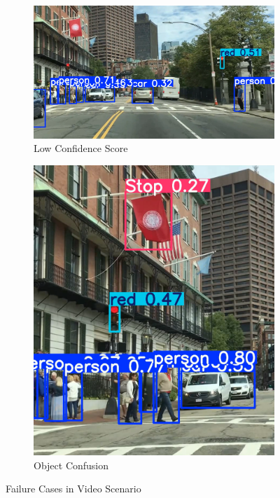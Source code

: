 \documentclass[journal,transmag]{IEEEtran}
\begin{document}
\begin{figure}[h]
    \centering
    \begin{subfigure}[b]{0.25\textwidth}
        \includegraphics[width=\textwidth]{Video_Fail_Result_1.png}
        \caption{Low Confidence Score}
        \label{fig:Low Confidence Score}
    \end{subfigure}
    \hfill
    \begin{subfigure}[b]{0.25\textwidth}
        \includegraphics[width=\textwidth]{Video_Fail_Result_2.png}
        \caption{Object Confusion}
        \label{fig:Object Confusion}
    \end{subfigure}
    \caption{Failure Cases in Video Scenario}
    \label{fig:Failure Cases in Video Scenario}
\end{figure}
\end{document}
